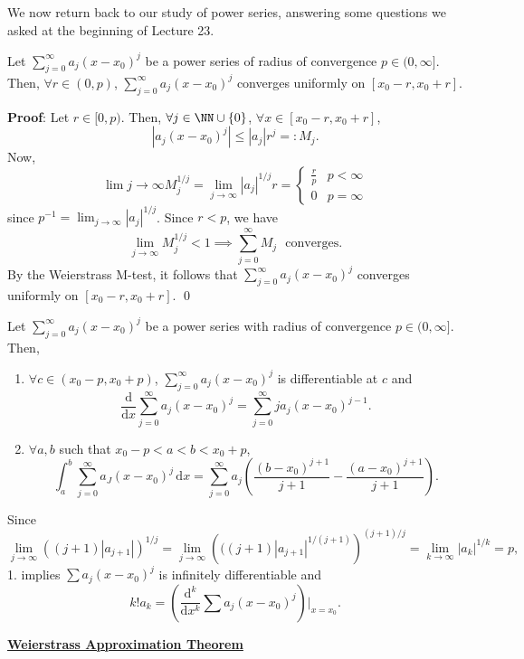 We now return back to our study of power series, answering some questions we asked at the beginning of Lecture 23.

\begin{theorem}
Let $\sum_{j=0}^\infty a_j(x-x_0)^j$ be a power series of radius of convergence $p\in (0,\infty]$. Then, $\forall r\in (0,p)$, $\sum_{j=0}^\infty a_j(x-x_0)^j$ converges uniformly on $[x_0-r,x_0+r]$.
\end{theorem}
\textbf{Proof}: Let $r\in [0,p)$. Then, $\forall j \in \NN \cup\{0\}$, $\forall x\in [x_0-r,x_0+r]$,
\[
|a_j(x-x_0)^j| \leq |a_j|r^j =:M_j.
\]
Now, 
\[
\lim_{}j\to \infty M_j^{1/j} = \lim_{j\to \infty} |a_j|^{1/j} r = \begin{cases} 
\frac{r}{p} &p< \infty \\
0 &p=\infty
\end{cases}
\]
since $p^{-1} = \lim_{j\to \infty} |a_j|^{1/j}$. Since $r<p$, we have 
\[
\lim_{j\to \infty}M_j^{1/j} < 1 \implies \sum_{j=0}^\infty M_j \text{~~converges.}
\]
By the Weierstrass M-test, it follows that $\sum_{j=0}^\infty a_j(x-x_0)^j$ converges uniformly on $[x_0-r, x_0+r]$. \qed 

\begin{theorem}
Let $\sum_{j=0}^\infty a_j(x-x_0)^j$ be a power series with radius of convergence $p\in (0,\infty]$. Then, 
\begin{enumerate}
    \item $\forall c\in (x_0-p, x_0+p)$, $\sum_{j=0}^\infty a_j(x-x_0)^j$ is differentiable at $c$ and 
    \[
    \frac{\mathrm d}{\mathrm dx} \sum_{j=0}^\infty a_j(x-x_0)^j = \sum_{j=0}^\infty ja_j(x-x_0)^{j-1}.
    \]
    \item $\forall a,b$ such that $x_0-p<a<b<x_0 + p$,
    \[
    \int_a^b \sum_{j=0}^\infty a_J(x-x_0)^j\,\mathrm dx = \sum_{j=0}^\infty a_j\left(\frac{(b-x_0)^{j+1}}{j+1} - \frac{(a-x_0)^{j+1}}{j+1}\right).
    \]
\end{enumerate}
\end{theorem}

\begin{remark}
Since 
\[
\lim_{j\to \infty}((j+1)|a_{j+1}|)^{1/j} = \lim_{j\to \infty} \left(((j+1)|a_{j+1}|^{1/(j+1)}\right)^{(j+1)/j} = \lim_{k\to \infty} |a_k|^{1/k} = p,
\]
1. implies $\sum a_j(x-x_0)^j$ is infinitely differentiable and 
\[
k!a_k = \left(\frac{\mathrm d^k}{\mathrm dx^k} \sum a_j(x-x_0)^j\right)\bigr|_{x=x_0}.
\]
\end{remark}

\noindent\underline{\textbf{Weierstrass Approximation Theorem}}

